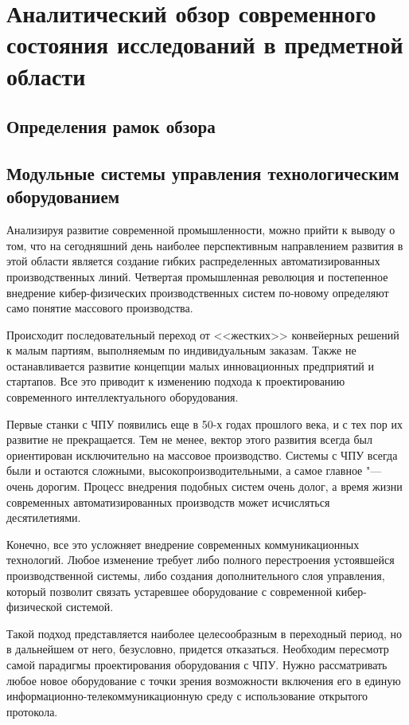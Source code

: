 \chapter{Аналитический обзор современного состояния исследований в предметной области}\label{ch:ch1}

\section{Определения рамок обзора}\label{sec:ch1/sec1}

\section{Модульные системы управления технологическим оборудованием}\label{sec:ch1/sec2}

Анализируя развитие современной промышленности, можно прийти к выводу о том, что на сегодняшний день наиболее перспективным направлением развития в этой области является создание гибких распределенных автоматизированных производственных линий. Четвертая промышленная революция и постепенное внедрение кибер-физических производственных систем по-новому определяют само понятие массового производства.

Происходит последовательный переход от <<жестких>> конвейерных решений к малым партиям, выполняемым по индивидуальным заказам. Также не останавливается развитие  концепции малых инновационных предприятий и стартапов. Все это приводит к изменению подхода к проектированию современного интеллектуального оборудования. 

Первые станки с ЧПУ появились еще в 50-х годах прошлого века, и с тех пор их развитие не прекращается. Тем не менее, вектор этого развития всегда был ориентирован исключительно на массовое производство. Системы с ЧПУ всегда были и остаются сложными, высокопроизводительными, а самое главное "--- очень дорогим. Процесс внедрения подобных систем очень долог, а время жизни современных автоматизированных производств может исчисляться десятилетиями.

Конечно, все это усложняет внедрение современных коммуникационных технологий. Любое изменение требует либо полного перестроения устоявшейся производственной системы, либо создания дополнительного слоя управления, который позволит связать устаревшее оборудование с современной кибер-физической системой.

Такой подход представляется наиболее целесообразным в переходный период, но в дальнейшем от него, безусловно, придется отказаться. Необходим пересмотр самой парадигмы проектирования оборудования с ЧПУ. Нужно рассматривать любое новое оборудование с точки зрения возможности включения его в единую информационно-телекоммуникационную среду с использование открытого протокола.

